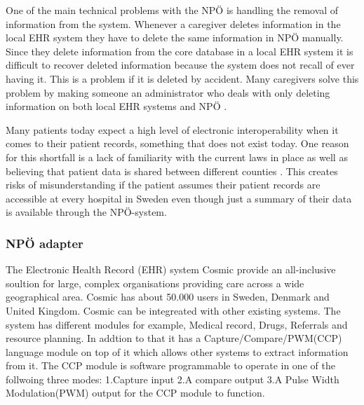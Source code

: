 \documentclass[14pt]{article}
\begin{document}
One of the main technical problems with the NPÖ is handling the removal of information from the system. Whenever a caregiver deletes information in the local EHR system they have to delete the same information in NPÖ manually. Since they delete information from the core database in a local EHR system it is difficult to recover deleted information because the system does not recall of ever having it. This is a problem if it is deleted by accident. Many caregivers solve this problem by making someone an administrator who deals with only deleting information on both local EHR systems and NPÖ  \cite{ViktorJernelov}.

Many patients today expect a high level of electronic interoperability when it comes to their patient records\cite{EPJ2}, something that does not exist today. One reason for this shortfall is a lack of familiarity with the current laws in place as well as believing that patient data is shared between different counties \cite{EPJ2}. This creates risks of misunderstanding if the patient assumes their patient records are accessible at every hospital in Sweden even though just a summary of their data is available through the NPÖ-system.
\label{sec:npoInterv}
\subsubsection{NPÖ adapter}
\label{sec:npoIntervi}

The Electronic Health Record (EHR) system Cosmic provide an all-inclusive soultion for large, complex organisations providing care across a wide geographical area. Cosmic has about 50.000 users in Sweden, Denmark and United Kingdom. Cosmic can be integreated with other existing systems. The system has different modules for example, Medical record, Drugs, Referrals and resource planning. In addtion to that it has a Capture/Compare/PWM(CCP) language module on top of it which allows other systems to extract information from it. The CCP module is software programmable to operate in one of the follwoing three modes: 1.Capture input 2.A compare output 3.A Pulse Width Modulation(PWM) output for the CCP module to function. 
\end{document}

